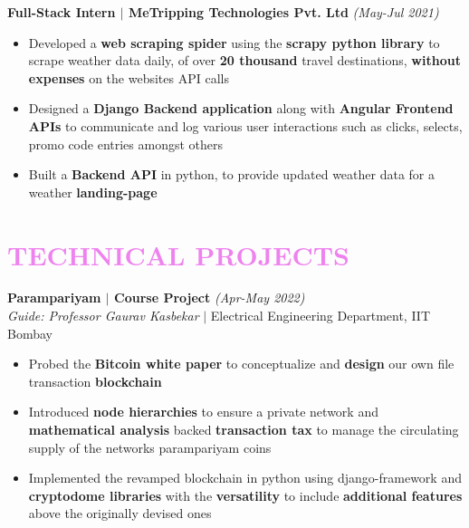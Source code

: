 \documentclass[a4paper,11pt]{article}
\begin{document}
\textbf{Full-Stack Intern $\mid$ MeTripping Technologies Pvt. Ltd} \hfill \emph{(May-Jul 2021)}
\vspace{-7.5pt}
\begin{itemize}[noitemsep]
    \item Developed a \textbf{web scraping spider} using the \textbf{scrapy python library} to scrape  weather data daily, of over \textbf{20 thousand} travel destinations, \textbf{without expenses} on the websites API calls
    \item Designed a \textbf{Django Backend application} along with \textbf{Angular Frontend APIs} to communicate and log various user interactions such as clicks, selects, promo code entries amongst others
    \item Built a \textbf{Backend API} in python, to provide updated weather data for a weather \textbf{landing-page}
\end{itemize}
\vspace{-7mm}

\section{\textcolor{Violet}{\bf{\Large{T}\large{ECHNICAL} \Large{P}\large{ROJECTS}}}}
\vspace{-7.5pt}

\textbf{Parampariyam $\mid$ Course Project} \hfill \emph{(Apr-May 2022)}\\
\vspace{-2pt}
\emph{Guide: Professor Gaurav Kasbekar} $\mid$ Electrical Engineering Department, IIT Bombay
\vspace{-7.5pt}
\begin{itemize}[noitemsep]
    \item Probed the \textbf{Bitcoin white paper} to conceptualize and \textbf{design} our own file transaction \textbf{blockchain} 
    \item Introduced \textbf{node hierarchies} to ensure a private network and \textbf{mathematical analysis} backed \textbf{transaction tax} to manage the circulating supply of the networks parampariyam coins
    \item Implemented the revamped blockchain in python using django-framework and \textbf{cryptodome libraries} with the \textbf{versatility} to include \textbf{additional features} above the originally devised ones
\end{itemize}
\vspace{-5pt}
\end{document}
